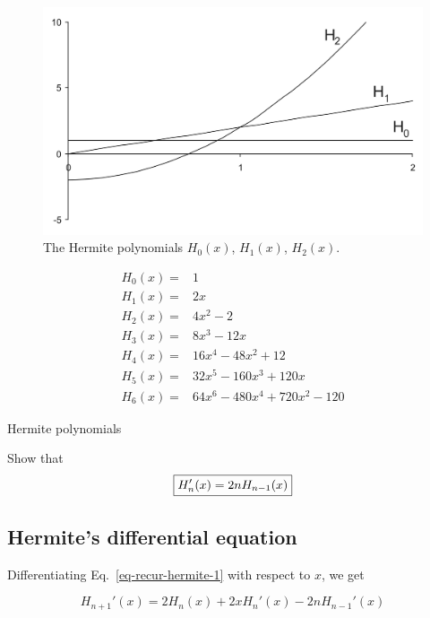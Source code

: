 \begin{figure}
\centering
\includegraphics[scale=0.7]{special/figures/hermite}
\caption{The Hermite polynomials $H_0(x)$, $H_1(x)$, $H_2(x)$.}
\label{fig-hermite}
\end{figure}

\begin{table}
\begin{align}
H_0(x) = & 1 \nonumber \\
H_1(x) = & 2x \nonumber \\
H_2(x) = & 4x^2-2 \nonumber \\
H_3(x) = & 8x^3-12x \nonumber \\
H_4(x) = & 16x^4-48x^2+12 \nonumber \\
H_5(x) = & 32x^5-160x^3+120x \nonumber \\
H_6(x) = & 64x^6-480x^4+720x^2-120 \nonumber
\end{align}
\caption{Hermite polynomials}
\label{tab-hermite}
\end{table}  

\begin{sidebar}
\begin{ex}
Show that
$$\fbox{$\displaystyle H_n'(x) = 2nH_{n-1}(x)$}$$ \label{eq-recur-hermite-2}
\end{ex}
\end{sidebar}

\subsection{Hermite's differential equation}

Differentiating Eq.~\ref{eq-recur-hermite-1} with respect to $x$, we get

\begin{equation}
H_{n+1}'(x) = 2  H_n(x) + 2 x H_n'(x)- 2 n H_{n-1}'(x)
\end{equation} 

